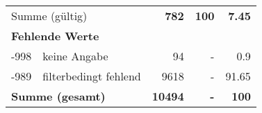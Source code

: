 \begin{longtable}{lXrrr}
     \midrule
     \multicolumn{2}{l}{Summe (gültig)} &
       \textbf{\num{782}} &
     \textbf{100} &
       \textbf{\num[round-mode=places,round-precision=2]{7,45}} \\
     \multicolumn{5}{l}{\textbf{Fehlende Werte}}\\
       -998 &
       keine Angabe &
         \num{94} &
        - &
         \num[round-mode=places,round-precision=2]{0,9} \\
       -989 &
       filterbedingt fehlend &
         \num{9618} &
        - &
         \num[round-mode=places,round-precision=2]{91,65} \\
     \midrule
     \multicolumn{2}{l}{\textbf{Summe (gesamt)}} &
          \textbf{\num{10494}} &
        \textbf{-} &
        \textbf{100} \\
     \bottomrule
     \end{longtable}
     
